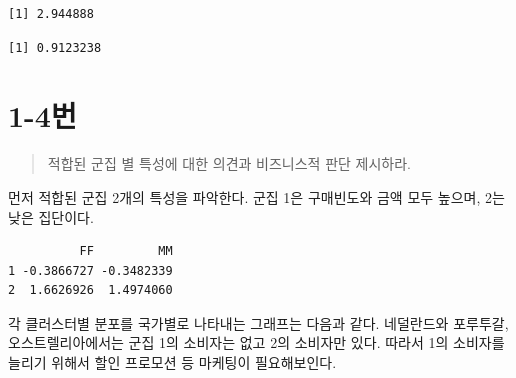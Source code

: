 \documentclass[
  letterpaper,
  DIV=11,
  numbers=noendperiod]{scrreprt}
\newenvironment{Shaded}{\begin{snugshade}}{\end{snugshade}}
\newcommand{\CommentTok}[1]{\textcolor[rgb]{0.37,0.37,0.37}{#1}}
\newcommand{\FunctionTok}[1]{\textcolor[rgb]{0.28,0.35,0.67}{#1}}
\newcommand{\NormalTok}[1]{\textcolor[rgb]{0.00,0.23,0.31}{#1}}
\newcommand{\SpecialCharTok}[1]{\textcolor[rgb]{0.37,0.37,0.37}{#1}}
\begin{document}
\begin{verbatim}
[1] 2.944888
\end{verbatim}

\begin{Shaded}
\end{Shaded}

\begin{verbatim}
[1] 0.9123238
\end{verbatim}

\hypertarget{uxbc88-42}{%
\section*{1-4번}\label{uxbc88-42}}


\begin{quote}
적합된 군집 별 특성에 대한 의견과 비즈니스적 판단 제시하라.
\end{quote}

먼저 적합된 군집 2개의 특성을 파악한다. 군집 1은 구매빈도와 금액 모두
높으며, 2는 낮은 집단이다.

\begin{Shaded}
\end{Shaded}

\begin{verbatim}
          FF         MM
1 -0.3866727 -0.3482339
2  1.6626926  1.4974060
\end{verbatim}

각 클러스터별 분포를 국가별로 나타내는 그래프는 다음과 같다. 네덜란드와
포루투갈, 오스트렐리아에서는 군집 1의 소비자는 없고 2의 소비자만 있다.
따라서 1의 소비자를 늘리기 위해서 할인 프로모션 등 마케팅이
필요해보인다.
\end{document}
